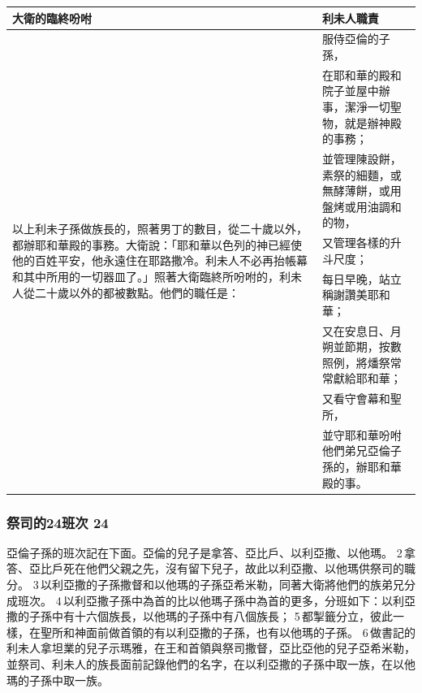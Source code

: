 \begin{table}[H]
\centering
\vspace{-5mm}
\begin{tabular}{p{6.5cm}|p{10.5cm}}\hline\hline
大衛的臨終吩咐&利未人職責\\\hline 
\multirow{8}{6.6cm}{以上利未子孫做族長的，照著男丁的數目，從二十歲以外，都辦耶和華殿的事務。大衛說：「耶和華以色列的神已經使他的百姓平安，他永遠住在耶路撒冷。利未人不必再抬帳幕和其中所用的一切器皿了。」照著大衛臨終所吩咐的，利未人從二十歲以外的都被數點。他們的職任是：}&服侍亞倫的子孫，\\\cline{2-2}
&在耶和華的殿和院子並屋中辦事，潔淨一切聖物，就是辦神殿的事務；\\\cline{2-2}
&並管理陳設餅，素祭的細麵，或無酵薄餅，或用盤烤或用油調和的物，\\\cline{2-2} 
&又管理各樣的升斗尺度；\\\cline{2-2} 
&每日早晚，站立稱謝讚美耶和華；\\\cline{2-2}
&又在安息日、月朔並節期，按數照例，將燔祭常常獻給耶和華；\\\cline{2-2}
&又看守會幕和聖所，\\\cline{2-2}
&並守耶和華吩咐他們弟兄亞倫子孫的，辦耶和華殿的事。\\\hline 
\end{tabular}
\end{table}	 


\subsubsection{祭司的24班次 24}
亞倫子孫的班次記在下面。亞倫的兒子是拿答、亞比戶、以利亞撒、以他瑪。 2 拿答、亞比戶死在他們父親之先，沒有留下兒子，故此以利亞撒、以他瑪供祭司的職分。 3 以利亞撒的子孫撒督和以他瑪的子孫亞希米勒，同著大衛將他們的族弟兄分成班次。 4 以利亞撒子孫中為首的比以他瑪子孫中為首的更多，分班如下：以利亞撒的子孫中有十六個族長，以他瑪的子孫中有八個族長； 5 都掣籤分立，彼此一樣，在聖所和神面前做首領的有以利亞撒的子孫，也有以他瑪的子孫。 6 做書記的利未人拿坦業的兒子示瑪雅，在王和首領與祭司撒督，亞比亞他的兒子亞希米勒，並祭司、利未人的族長面前記錄他們的名字，在以利亞撒的子孫中取一族，在以他瑪的子孫中取一族。

